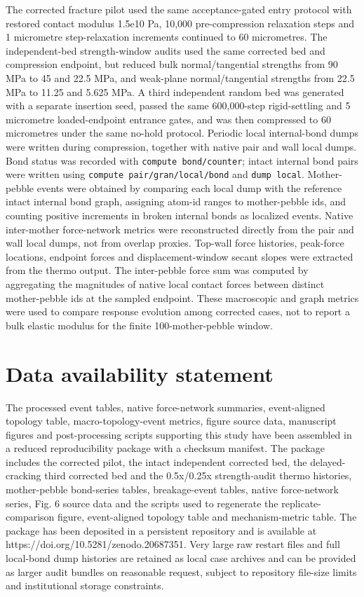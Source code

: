 \documentclass[5p,twocolumn]{elsarticle}
\begin{document}
The corrected fracture pilot used the same acceptance-gated entry protocol with restored contact modulus 1.5e10 Pa, 10,000 pre-compression relaxation steps and 1 micrometre step-relaxation increments continued to 60 micrometres. The independent-bed strength-window audits used the same corrected bed and compression endpoint, but reduced bulk normal/tangential strengths from 90 MPa to 45 and 22.5 MPa, and weak-plane normal/tangential strengths from 22.5 MPa to 11.25 and 5.625 MPa. A third independent random bed was generated with a separate insertion seed, passed the same 600,000-step rigid-settling and 5 micrometre loaded-endpoint entrance gates, and was then compressed to 60 micrometres under the same no-hold protocol. Periodic local internal-bond dumps were written during compression, together with native pair and wall local dumps. Bond status was recorded with \texttt{compute bond/counter}; intact internal bond pairs were written using \texttt{compute pair/gran/local/bond} and \texttt{dump local}. Mother-pebble events were obtained by comparing each local dump with the reference intact internal bond graph, assigning atom-id ranges to mother-pebble ids, and counting positive increments in broken internal bonds as localized events. Native inter-mother force-network metrics were reconstructed directly from the pair and wall local dumps, not from overlap proxies. Top-wall force histories, peak-force locations, endpoint forces and displacement-window secant slopes were extracted from the thermo output. The inter-pebble force sum was computed by aggregating the magnitudes of native local contact forces between distinct mother-pebble ids at the sampled endpoint. These macroscopic and graph metrics were used to compare response evolution among corrected cases, not to report a bulk elastic modulus for the finite 100-mother-pebble window.


\section{Data availability statement}

The processed event tables, native force-network summaries, event-aligned topology table, macro-topology-event metrics, figure source data, manuscript figures and post-processing scripts supporting this study have been assembled in a reduced reproducibility package with a checksum manifest. The package includes the corrected pilot, the intact independent corrected bed, the delayed-cracking third corrected bed and the 0.5x/0.25x strength-audit thermo histories, mother-pebble bond-series tables, breakage-event tables, native force-network series, Fig. 6 source data and the scripts used to regenerate the replicate-comparison figure, event-aligned topology table and mechanism-metric table. The package has been deposited in a persistent repository and is available at https://doi.org/10.5281/zenodo.20687351. Very large raw restart files and full local-bond dump histories are retained as local case archives and can be provided as larger audit bundles on reasonable request, subject to repository file-size limits and institutional storage constraints.
\end{document}
